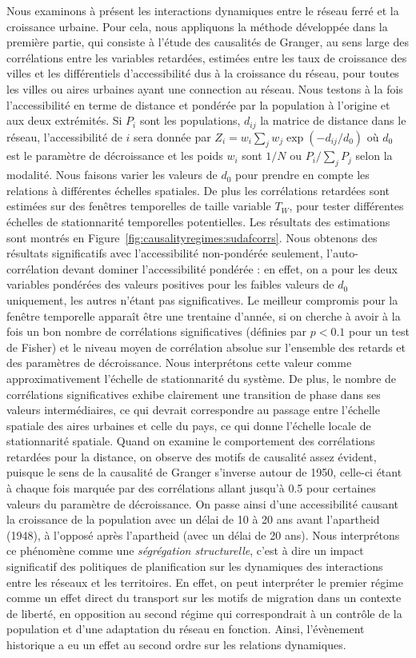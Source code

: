 {Nous examinons à présent les interactions dynamiques entre le réseau ferré et la croissance urbaine. Pour cela, nous appliquons la méthode développée dans la première partie, qui consiste à l'étude des causalités de Granger, au sens large des corrélations entre les variables retardées, estimées entre les taux de croissance des villes et les différentiels d'accessibilité dus à la croissance du réseau, pour toutes les villes ou aires urbaines ayant une connection au réseau. Nous testons à la fois l'accessibilité en terme de distance et pondérée par la population à l'origine et aux deux extrémités. Si $P_i$ sont les populations, $d_{ij}$ la matrice de distance dans le réseau, l'accessibilité de $i$ sera donnée par $Z_i = w_i \sum_j w_j \exp \left(- d_{ij} / d_0 \right)$ où $d_0$ est le paramètre de décroissance et les poids $w_i$ sont $1/N$ ou $P_i / \sum_j P_j$ selon la modalité. Nous faisons varier les valeurs de $d_0$ pour prendre en compte les relations à différentes échelles spatiales. De plus les corrélations retardées sont estimées sur des fenêtres temporelles de taille variable $T_W$, pour tester différentes échelles de stationnarité temporelles potentielles. Les résultats des estimations sont montrés en Figure~\ref{fig:causalityregimes:sudafcorrs}. Nous obtenons des résultats significatifs avec l'accessibilité non-pondérée seulement, l'auto-corrélation devant dominer l'accessibilité pondérée : en effet, on a pour les deux variables pondérées des valeurs positives pour les faibles valeurs de $d_0$ uniquement, les autres n'étant pas significatives. Le meilleur compromis pour la fenêtre temporelle apparaît être une trentaine d'année, si on cherche à avoir à la fois un bon nombre de corrélations significatives (définies par $p<0.1$ pour un test de Fisher) et le niveau moyen de corrélation absolue sur l'ensemble des retards et des paramètres de décroissance. Nous interprétons cette valeur comme approximativement l'échelle de stationnarité du système. De plus, le nombre de corrélations significatives exhibe clairement une transition de phase dans ses valeurs intermédiaires, ce qui devrait correspondre au passage entre l'échelle spatiale des aires urbaines et celle du pays, ce qui donne l'échelle locale de stationnarité spatiale. Quand on examine le comportement des corrélations retardées pour la distance, on observe des motifs de causalité assez évident, puisque le sens de la causalité de Granger s'inverse autour de 1950, celle-ci étant à chaque fois marquée par des corrélations allant jusqu'à 0.5 pour certaines valeurs du paramètre de décroissance. On passe ainsi d'une accessibilité causant la croissance de la population avec un délai de 10 à 20 ans avant l'apartheid (1948), à l'opposé après l'apartheid (avec un délai de 20 ans). Nous interprétons ce phénomène comme une \emph{ségrégation structurelle}, c'est à dire un impact significatif des politiques de planification sur les dynamiques des interactions entre les réseaux et les territoires. En effet, on peut interpréter le premier régime comme un effet direct du transport sur les motifs de migration dans un contexte de liberté, en opposition au second régime qui correspondrait à un contrôle de la population et d'une adaptation du réseau en fonction. Ainsi, l'évènement historique a eu un effet au second ordre sur les relations dynamiques.
}


